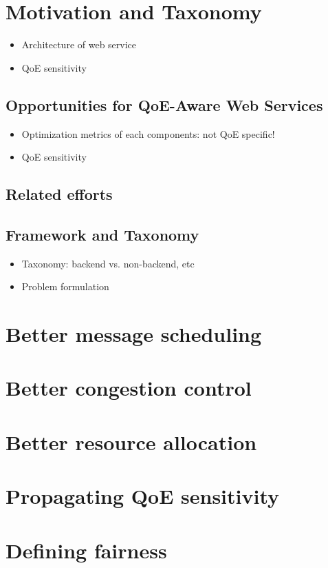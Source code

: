 \section{Motivation and Taxonomy}

\begin{itemize}
    \item Architecture of web service
    \item QoE sensitivity
\end{itemize}

\subsection{Opportunities for QoE-Aware Web Services}
\begin{itemize}
    \item Optimization metrics of each components: not QoE specific!
    \item QoE sensitivity
\end{itemize}

\subsection{Related efforts}

\subsection{Framework and Taxonomy}
\begin{itemize}
    \item Taxonomy: backend vs. non-backend, etc
    \item Problem formulation
\end{itemize}


\section{Better message scheduling}

\section{Better congestion control}

\section{Better resource allocation}

\section{Propagating QoE sensitivity}

\section{Defining fairness}




